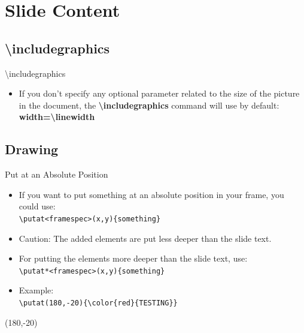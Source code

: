 \documentclass[english,sectioncirclenumberstyle]{ciadbeamer}
\begin{document}
\section{Slide Content}
\sectiontableofcontentslide

\subsection{{\textbackslash}includegraphics}
\subsectiontableofcontentslide

\begin{frame}{{\textbackslash}includegraphics}
	\begin{itemize}
	\vspace{2em}
	\item If you don't specify any optional parameter related to the size of the picture in the document, the \textbf{{\textbackslash}includegraphics} command will use by default: \\
		\textbf{width={\textbackslash}linewidth}
	\end{itemize}
\end{frame}

\subsection{Drawing}
\subsectiontableofcontentslide

\begin{frame}{Put at an Absolute Position}
	\begin{itemize}
	\item If you want to put something at an absolute position in your frame, you could use: \\
		\texttt{{\textbackslash}putat<framespec>(x,y)\{something\}}
	\item \alert{Caution: The added elements are put less deeper than the slide text.}
	\item For putting the elements more deeper than the slide text, use: \\
		\texttt{{\textbackslash}putat*<framespec>(x,y)\{something\}}
	\vspace{1em}
	\item Example: \\
		\texttt{{\textbackslash}putat(180,-20)\{{\textbackslash}color\{red\}\{TESTING\}\}}
	\end{itemize}
	\putat(180,-20){\color{red}{TESTING}}
\end{frame}
\end{document}

